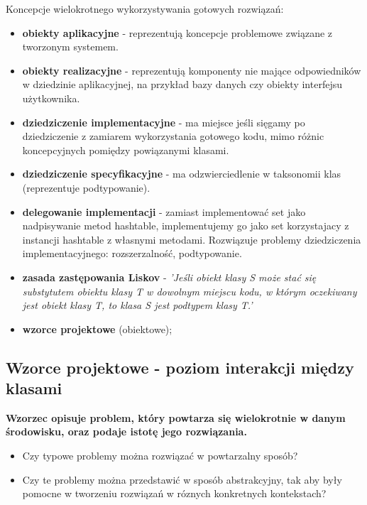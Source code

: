 \documentclass[a4paper]{article}
\begin{document}
    Koncepcje wielokrotnego wykorzystywania gotowych rozwiązań:
    \begin{itemize}
        \item \textbf{obiekty aplikacyjne} - reprezentują koncepcje problemowe związane z tworzonym systemem.
        \item \textbf{obiekty realizacyjne} - reprezentują komponenty nie mające odpowiedników w
        dziedzinie aplikacyjnej, na przykład bazy danych czy obiekty interfejsu użytkownika.
        \item \textbf{dziedziczenie implementacyjne} - ma miejsce jeśli sięgamy po dziedziczenie z zamiarem wykorzystania
        gotowego kodu, mimo różnic koncepcyjnych pomiędzy powiązanymi klasami.
        \item \textbf{dziedziczenie specyfikacyjne} - ma odzwierciedlenie w taksonomii klas (reprezentuje podtypowanie).
        \item \textbf{delegowanie implementacji} - zamiast implementować set jako nadpisywanie metod hashtable, implementujemy go jako set korzystajacy z instancji hashtable z własnymi metodami.
        Rozwiązuje problemy dziedziczenia implementacyjnego: rozszerzalność, podtypowanie.
        \item \textbf{zasada zastępowania Liskov} - \textit{'Jeśli obiekt klasy S może stać się substytutem obiektu klasy T w
        dowolnym miejscu kodu, w którym oczekiwany jest obiekt klasy T, to klasa S jest podtypem klasy T.'}
        \item \textbf{wzorce projektowe} (obiektowe);
    \end{itemize}

    \subsection{Wzorce projektowe - poziom interakcji między klasami}
    \textbf{Wzorzec opisuje problem, który powtarza się wielokrotnie w danym środowisku, oraz podaje istotę
    jego rozwiązania.}

    \begin{itemize}
        \item Czy typowe problemy można rozwiązać w powtarzalny sposób?
        \item Czy te problemy można przedstawić w sposób abstrakcyjny, tak aby były pomocne
        w tworzeniu rozwiązań w róznych konkretnych kontekstach?
    \end{itemize}
\end{document}
